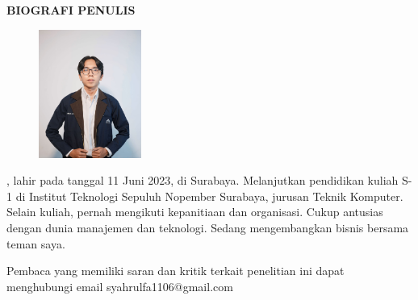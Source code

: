 \begin{center}
  \Large
  \textbf{BIOGRAFI PENULIS}
\end{center}


\vspace{2ex}

\begin{figure}
  \centering
  \vspace{-3ex}
  \includegraphics[width=0.3\textwidth]{BiografiPenulis/fotoku.png}
  \vspace{-4ex}
\end{figure}

\name{}, lahir pada tanggal 11 Juni 2023, di Surabaya. Melanjutkan pendidikan kuliah S-1 di Institut Teknologi Sepuluh Nopember Surabaya, jurusan Teknik Komputer. Selain kuliah, pernah mengikuti kepanitiaan dan organisasi. Cukup antusias dengan dunia manajemen dan teknologi. Sedang mengembangkan bisnis bersama teman saya.

Pembaca yang memiliki saran dan kritik terkait penelitian ini dapat menghubungi email syahrulfa1106@gmail.com
